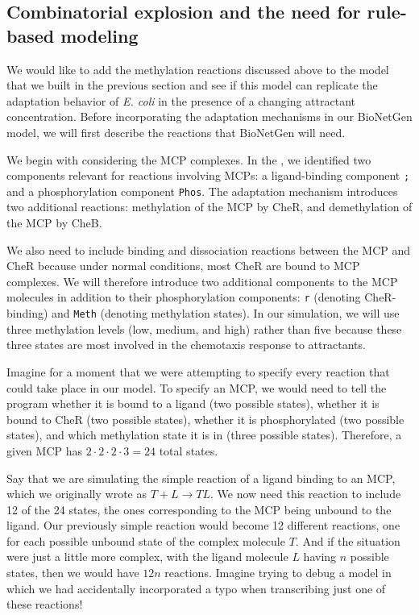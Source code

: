 \FloatBarrier
{}
\subsection{Combinatorial explosion and the need for rule-based modeling}

We would like to add the methylation reactions discussed above to the model that we built in the previous section and see if this model can replicate the adaptation behavior of \textit{E. coli} in the presence of a changing attractant concentration. Before incorporating the adaptation mechanisms in our BioNetGen model, we will first describe the reactions that BioNetGen will need.

We begin with considering the MCP complexes. In the , we identified two components relevant for reactions involving MCPs: a ligand-binding component \texttt{;} and a phosphorylation component \texttt{Phos}. The adaptation mechanism introduces two additional reactions: methylation of the MCP by CheR, and demethylation of the MCP by CheB.

We also need to include binding and dissociation reactions between the MCP and CheR because under normal conditions, most CheR are bound to MCP complexes.\citep{Lupas_1989} We will therefore introduce two additional components to the MCP molecules in addition to their phosphorylation components: \texttt{r} (denoting CheR-binding) and \texttt{Meth} (denoting methylation states). In our simulation, we will use three methylation levels (low, medium, and high) rather than five because these three states are most involved in the chemotaxis response to attractants.\citep{Boyd_1980}

Imagine for a moment that we were attempting to specify every reaction that could take place in our model. To specify an MCP, we would need to tell the program whether it is bound to a ligand (two possible states), whether it is bound to CheR (two possible states), whether it is phosphorylated (two possible states), and which methylation state it is in (three possible states). Therefore, a given MCP has $2 \cdot 2 \cdot 2 \cdot 3 = 24$ total states.

Say that we are simulating the simple reaction of a ligand binding to an MCP, which we originally wrote as $T + L \rightarrow TL$. We now need this reaction to include 12 of the 24 states, the ones corresponding to the MCP being unbound to the ligand. Our previously simple reaction would become 12 different reactions, one for each possible unbound state of the complex molecule $T$. And if the situation were just a little more complex, with the ligand molecule $L$ having $n$ possible states, then we would have $12n$ reactions. Imagine trying to debug a model in which we had accidentally incorporated a typo when transcribing just one of these reactions!

